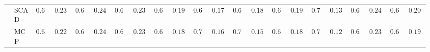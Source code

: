 \begin{tabular}{p{0.2cm}p{1cm}|p{0.6cm}p{0.6cm}|p{0.6cm}p{0.6cm}p{0.6cm}p{0.6cm}p{0.6cm}p{0.6cm}|p{0.6cm}p{0.6cm}p{0.6cm}p{0.6cm}p{0.6cm}p{0.6cm}|p{0.6cm}p{0.6cm}p{0.6cm}p{0.6cm}p{0.6cm}p{0.6cm}}
 & SCAD  & $0.640$ & $0.2395$ & $0.640$ & $0.2494$ & $0.612$ & $0.2341$ & $0.694$ & $0.1958$ & $0.684$ & $0.1710$ & $0.688$ & $0.1849$ & $0.670$ & $0.1957$ & $0.734$ & $0.1304$ & $0.634$ & $0.2413$ & $0.660$ & $0.2040$ \\
 & MCP  & $0.678$ & $0.2290$ & $0.668$ & $0.2465$ & $0.642$ & $0.2383$ & $0.690$ & $0.1850$ & $0.722$ & $0.1630$ & $0.726$ & $0.1599$ & $0.694$ & $0.1808$ & $0.746$ & $0.1201$ & $0.666$ & $0.2328$ & $0.688$ & $0.1996$ \\
\hline 
\end{tabular}

